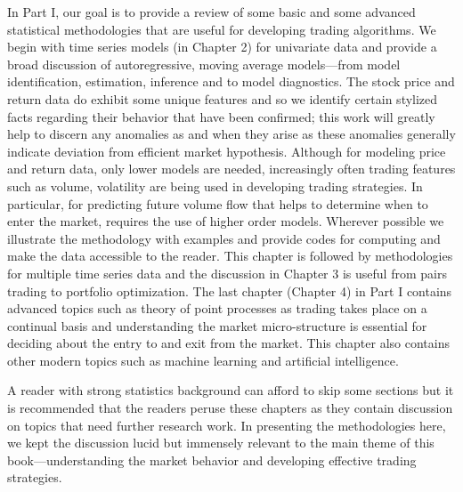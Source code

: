 
In Part I, our goal is to provide a review of some basic and some advanced statistical methodologies that are useful for developing trading algorithms. We begin with time series models (in Chapter 2) for univariate data and provide a broad discussion of autoregressive, moving average models---from model identification, estimation, inference and to model diagnostics. The stock price and return data do exhibit some unique features and so we identify certain stylized facts regarding their behavior that have been confirmed; this work will greatly help to discern any anomalies as and when they arise as these anomalies generally indicate deviation from efficient market hypothesis. Although for modeling price and return data, only lower models are needed, increasingly often trading features such as volume, volatility are being used in developing trading strategies. In particular, for predicting future volume flow that helps to determine when to enter the market, requires the use of higher order models. Wherever possible we illustrate the methodology with examples and provide codes for computing and make the data accessible to the reader. This chapter is followed by methodologies for multiple time series data and the discussion in Chapter 3 is useful from pairs trading to portfolio optimization. The last chapter (Chapter 4) in Part I contains advanced topics such as theory of point processes as trading takes place on a continual basis and understanding the market micro-structure is essential for deciding about the entry to and exit from the market. This chapter also contains other modern topics such as machine learning and artificial intelligence. 


A reader with strong statistics background can afford to skip some sections but it is recommended that the readers peruse these chapters as they contain discussion on topics that need further research work. In presenting the methodologies here, we kept the discussion lucid but immensely relevant to the main theme of this book---understanding the market behavior and developing effective trading strategies. 








